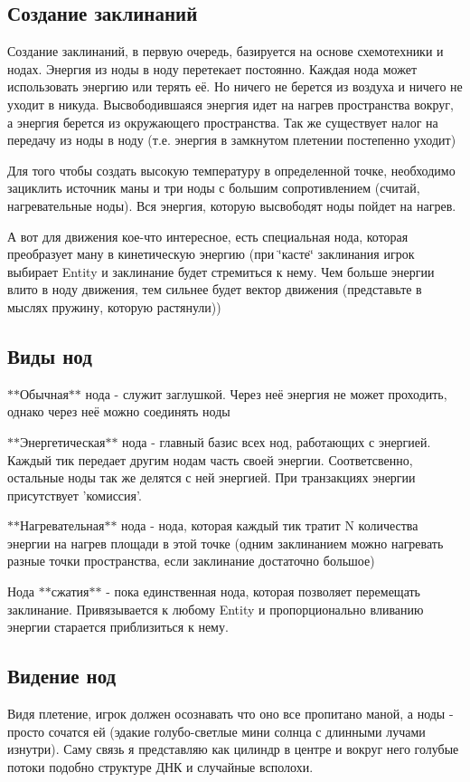 \subsection*{Создание заклинаний}

Создание заклинаний, в первую очередь, базируется на основе схемотехники и нодах. Энергия из ноды в ноду перетекает постоянно. Каждая нода может использовать энергию или терять её. Но ничего не берется из воздуха и ничего не уходит в никуда. Высвободившаяся энергия идет на нагрев пространства вокруг, а энергия берется из окружающего пространства. Так же существует налог на передачу из ноды в ноду (т.\-е. энергия в замкнутом плетении постепенно уходит)

Для того чтобы создать высокую температуру в определенной точке, необходимо зациклить источник маны и три ноды с большим сопротивлением (считай, нагревательные ноды). Вся энергия, которую высвободят ноды пойдет на нагрев.

А вот для движения кое-\/что интересное, есть специальная нода, которая преобразует ману в кинетическую энергию (при \char`\"{}касте\char`\"{} заклинания игрок выбирает Entity и заклинание будет стремиться к нему. Чем больше энергии влито в ноду движения, тем сильнее будет вектор движения (представьте в мыслях пружину, которую растянули))

\subsection*{Виды нод}


\begin{DoxyItemize}
\item $\ast$$\ast$Обычная$\ast$$\ast$ нода -\/ служит заглушкой. Через неё энергия не может проходить, однако через неё можно соединять ноды
\item $\ast$$\ast$Энергетическая$\ast$$\ast$ нода -\/ главный базис всех нод, работающих с энергией. Каждый тик передает другим нодам часть своей энергии. Соответсвенно, остальные ноды так же делятся с ней энергией. При транзакциях энергии присутствует 'комиссия'.
\item $\ast$$\ast$Нагревательная$\ast$$\ast$ нода -\/ нода, которая каждый тик тратит N количества энергии на нагрев площади в этой точке (одним заклинанием можно нагревать разные точки пространства, если заклинание достаточно большое)
\item Нода $\ast$$\ast$сжатия$\ast$$\ast$ -\/ пока единственная нода, которая позволяет перемещать заклинание. Привязывается к любому Entity и пропорционально вливанию энергии старается приблизиться к нему.
\end{DoxyItemize}

\subsection*{Видение нод}

Видя плетение, игрок должен осознавать что оно все пропитано маной, а ноды -\/ просто сочатся ей (эдакие голубо-\/светлые мини солнца с длинными лучами изнутри). Саму связь я представляю как цилиндр в центре и вокруг него голубые потоки подобно структуре ДНК и случайные всполохи. 